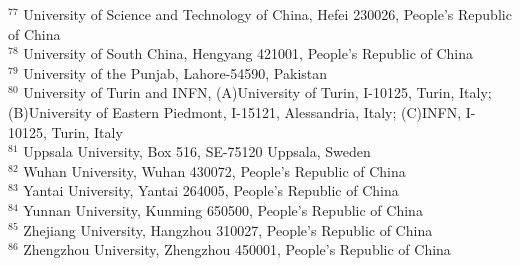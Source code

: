 \documentclass[prd,aps,reprint,noeprint,superscriptaddress,amsmath, amssymb]{revtex4-1}
\begin{document}
\begin{widetext}
\begin{center}
{$^{77}$ University of Science and Technology of China, Hefei 230026, People's Republic of China\\
$^{78}$ University of South China, Hengyang 421001, People's Republic of China\\
$^{79}$ University of the Punjab, Lahore-54590, Pakistan\\
$^{80}$ University of Turin and INFN, (A)University of Turin, I-10125, Turin, Italy; (B)University of Eastern Piedmont, I-15121, Alessandria, Italy; (C)INFN, I-10125, Turin, Italy\\
$^{81}$ Uppsala University, Box 516, SE-75120 Uppsala, Sweden\\
$^{82}$ Wuhan University, Wuhan 430072, People's Republic of China\\
$^{83}$ Yantai University, Yantai 264005, People's Republic of China\\
$^{84}$ Yunnan University, Kunming 650500, People's Republic of China\\
$^{85}$ Zhejiang University, Hangzhou 310027, People's Republic of China\\
$^{86}$ Zhengzhou University, Zhengzhou 450001, People's Republic of China\\

}
\end{center}
\end{widetext}
\end{document}
